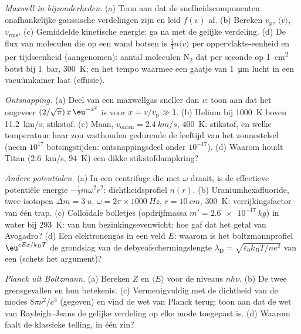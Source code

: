 \begin{exercise}[$\star\star$]\label{exo:b2:boltzmann-factor:8}
\emph{Maxwell in bijzonderheden.} (a) Toon aan dat de snelheidscomponenten
onafhankelijke gaussische verdelingen zijn en leid $f(v)$ af. (b) Bereken
$v_{\text{p}}$,
$\langle v\rangle$, $v_{\text{rms}}$. (c) Gemiddelde kinetische energie: ga na met
de gelijke verdeling. (d) De flux van moleculen die op een wand botsen is
$\tfrac14n\langle v\rangle$ per oppervlakte-eenheid en per tijdseenheid
(aangenomen): aantal
moleculen N$_2$ dat per seconde op \qty{1}{cm^2} botst bij \qty{1}{bar},
\qty{300}{K}; en het tempo waarmee een gaatje van \qty{1}{\micro m} lucht
in een vacuümkamer laat (effusie).
\end{exercise}

\begin{exercise}[$\star\star$]\label{exo:b2:boltzmann-factor:9}
\emph{Ontsnapping.} (a) Deel van een maxwellgas sneller dan $v$: toon aan dat het
ongeveer $(2/\sqrt\pi)\,x\,\eu^{-x^2}$ is voor $x = v/v_{\text{p}} \gg 1$.
(b) Helium bij \qty{1000}{K} boven \qty{11.2}{km/s}; stikstof. (c) Maan,
$v_{\text{ontsn}} = \qty{2.4}{km/s}$, \qty{400}{K}: stikstof, en welke
temperatuur haar zou vasthouden gedurende de leeftijd van het zonnestelsel
(neem $10^{17}$
botsingstijden: ontsnappingsdeel onder $10^{-17}$). (d) Waarom houdt Titan
(\qty{2.6}{km/s}, \qty{94}{K}) een dikke stikstofdampkring?
\end{exercise}

\begin{exercise}[$\star\star\star$]\label{exo:b2:boltzmann-factor:10}
\emph{Andere potentialen.} (a) In een centrifuge die met $\omega$ draait, is de
effectieve potentiële energie $-\tfrac12m\omega^2r^2$: dichtheidsprofiel
$n(r)$. (b) Uraniumhexafluoride, twee isotopen $\Delta m = \qty{3}{u}$,
$\omega
= 2\pi \times \qty{1000}{Hz}$, $r = \qty{10}{cm}$, \qty{300}{K}:
verrijkingsfactor
van één trap. (c) Colloïdale bolletjes (opdrijfmassa
$m' =
\qty{2.6e-17}{kg}$) in water bij \qty{293}{K}:  van hun
bezinkingsevenwicht; hoe gaf dat het getal van Avogadro? (d) Een
elektronengas in een veld $E$: waarom is het boltzmannprofiel
$\eu^{eEx/k_BT}$ de grondslag van de debyeafschermingslengte
$\lambda_{\text{D}} = \sqrt{\varepsilon_0k_BT/ne^2}$ van een  (schets het
argument)?
\end{exercise}

\begin{exercise}[$\star\star\star$]\label{exo:b2:boltzmann-factor:11}
\emph{Planck uit Boltzmann.} (a) Bereken $Z$ en $\langle E\rangle$ voor
de niveaus $nh\nu$. (b) De twee grensgevallen en hun betekenis. (c)
Vermenigvuldig met
de dichtheid van de modes $8\pi\nu^2/c^3$ (gegeven) en vind de wet van Planck terug;
toon aan dat de wet van Rayleigh--Jeans de gelijke verdeling op elke mode
toegepast is.
(d) Waarom faalt de klassieke telling, in één zin?
\end{exercise}

